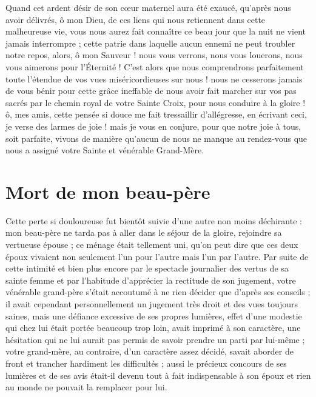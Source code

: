 \documentclass[11pt,a4paper]{report}
\begin{document}
Quand cet ardent désir de son cœur maternel aura été exaucé, qu'après nous avoir délivrés, ô mon Dieu, de ces liens qui nous retiennent dans cette malheureuse vie, vous nous aurez fait connaître ce beau jour que la nuit ne vient jamais interrompre ; cette patrie dans laquelle aucun ennemi ne peut troubler notre repos, alors, ô mon Sauveur ! nous vous verrons, nous vous louerons, nous vous aimerons pour l'Éternité ! C'est alors que nous comprendrons parfaitement toute l'étendue de vos vues miséricordieuses sur nous ! nous ne cesserons jamais de vous bénir pour cette grâce ineffable de nous avoir fait marcher sur vos pas sacrés par le chemin royal de votre Sainte Croix, pour nous conduire à la gloire ! ô, mes amis, cette pensée si douce me fait tressaillir d'allégresse, en écrivant ceci, je verse des larmes de joie ! mais je vous en conjure, pour que notre joie à tous, soit parfaite, vivons de manière qu'aucun de nous ne manque au rendez-vous que nous a assigné votre Sainte et vénérable Grand-Mère.

\section*{Mort de mon beau-père}

Cette perte si douloureuse fut bientôt suivie d'une autre non moins déchirante : mon beau-père ne tarda pas à aller dans le séjour de la gloire, rejoindre sa vertueuse épouse ; ce ménage était tellement uni, qu'on peut dire que ces deux époux vivaient non seulement l'un pour l'autre mais l'un par l'autre. Par suite de cette intimité et bien plus encore par le spectacle journalier des vertus de sa sainte femme et par l'habitude d'apprécier la rectitude de son jugement, votre vénérable grand-père s'était accoutumé à ne rien décider que d'après ses conseils ; il avait cependant personnellement un jugement très droit et des vues toujours saines, mais une défiance excessive de ses propres lumières, effet d'une modestie qui chez lui était portée beaucoup trop loin, avait imprimé à son caractère, une hésitation qui ne lui aurait pas permis de savoir prendre un parti par lui-même ; votre grand-mère, au contraire, d'un caractère assez décidé, savait aborder de front et trancher hardiment les difficultés ; aussi le précieux concours de ses lumières et de ses avis était-il devenu tout à fait indispensable à son époux et rien au monde ne pouvait la remplacer pour lui.
\end{document}
